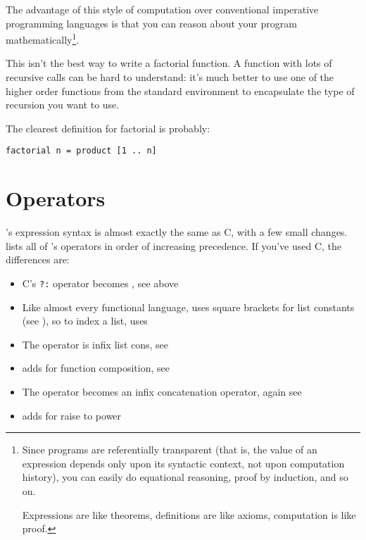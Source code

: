 The advantage of this style of computation over conventional imperative
programming languages is that you can reason about your program
mathematically\footnote{Since programs are referentially transparent (that
is, the value of an expression depends only upon its syntactic context,
not upon computation history), you can easily do equational reasoning,
proof by induction, and so on.

Expressions are like theorems, definitions are like axioms, computation
is like proof.}. 

This isn't the best way to write a factorial function. A function with lots of
recursive calls can be hard to understand: it's much better to use one of the
higher order functions from the standard environment to encapsulate the type
of recursion you want to use.

The clearest definition for factorial is probably:

\begin{verbatim}
factorial n = product [1 .. n]
\end{verbatim}

\section{Operators}

\nip{}'s expression syntax is almost exactly the same as C,
with a few small changes.  lists all of 
\nip{}'s operators in order of increasing precedence. If you've used C, the
differences are:

\begin{itemize}

\item
	C's \verb+?:+ operator becomes , see above

\item
	Like almost every functional language, \nip{} uses square brackets
	for list constants (see ), so to index a
	list, \nip{} uses 

\item
	The \ct{:} operator is infix list cons, see 

\item
	\nip{} adds  for function composition, see 

\item
	The \ct{++} operator becomes an infix concatenation operator, again
	see 

\item
	\nip{} adds \ct{**} for raise to power

\end{itemize}

